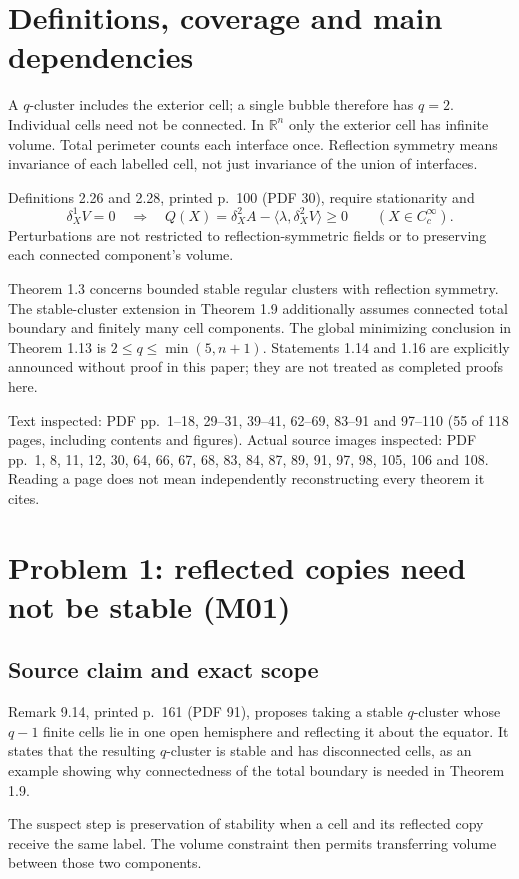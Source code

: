 \documentclass[10pt]{article}
\begin{document}
\section*{Definitions, coverage and main dependencies}
A \(q\)-cluster includes the exterior cell; a single bubble therefore has \(q=2\). Individual cells need not be connected. In \(\mathbb R^n\) only the exterior cell has infinite volume. Total perimeter counts each interface once. Reflection symmetry means invariance of each labelled cell, not just invariance of the union of interfaces.\par
Definitions 2.26 and 2.28, printed p. 100 (PDF 30), require stationarity and \[\delta_X^1 V=0\quad\Longrightarrow\quad
 Q(X)=\delta_X^2 A-\langle\lambda,\delta_X^2V\rangle\geq0
 \qquad (X\in C_c^\infty).\] Perturbations are not restricted to reflection-symmetric fields or to preserving each connected component’s volume.\par
Theorem 1.3 concerns bounded stable regular clusters with reflection symmetry. The stable-cluster extension in Theorem 1.9 additionally assumes connected total boundary and finitely many cell components. The global minimizing conclusion in Theorem 1.13 is \(2\leq q\leq\min(5,n+1)\). Statements 1.14 and 1.16 are explicitly announced without proof in this paper; they are not treated as completed proofs here.\par
Text inspected: PDF pp. 1–18, 29–31, 39–41, 62–69, 83–91 and 97–110 (55 of 118 pages, including contents and figures). Actual source images inspected: PDF pp. 1, 8, 11, 12, 30, 64, 66, 67, 68, 83, 84, 87, 89, 91, 97, 98, 105, 106 and 108. Reading a page does not mean independently reconstructing every theorem it cites.\par
\section*{Problem 1: reflected copies need not be stable (M01)}
\subsection*{Source claim and exact scope}
Remark 9.14, printed p. 161 (PDF 91), proposes taking a stable \(q\)-cluster whose \(q-1\) finite cells lie in one open hemisphere and reflecting it about the equator. It states that the resulting \(q\)-cluster is stable and has disconnected cells, as an example showing why connectedness of the total boundary is needed in Theorem 1.9.\par
The suspect step is preservation of stability when a cell and its reflected copy receive the same label. The volume constraint then permits transferring volume between those two components.\par
\end{document}
